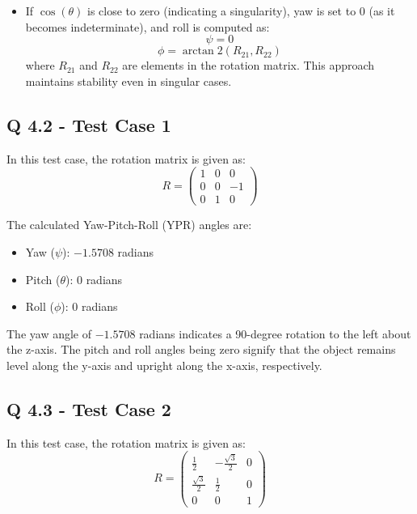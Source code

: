\begin{enumerate}
\begin{itemize}
\begin{itemize}
            \item If \( \cos(\theta) \) is close to zero (indicating a singularity), yaw is set to 0 (as it becomes indeterminate), and roll is computed as:
            \begin{equation}
            \psi = 0
            \end{equation}
            \begin{equation}
            \phi = \arctan2(R_{21}, R_{22})
            \end{equation}
            where \( R_{21} \) and \( R_{22} \) are elements in the rotation matrix. This approach maintains stability even in singular cases.
        \end{itemize}
    \end{itemize}
\end{enumerate}

\subsection{Q 4.2 - Test Case 1 }

In this test case, the rotation matrix is given as:
\[
R =
\begin{pmatrix}
1 & 0 & 0 \\
0 & 0 & -1 \\
0 & 1 & 0
\end{pmatrix}
\]

The calculated Yaw-Pitch-Roll (YPR) angles are:
\begin{itemize}
    \item Yaw (\(\psi\)): \(-1.5708\) radians
    \item Pitch (\(\theta\)): \(0\) radians
    \item Roll (\(\phi\)): \(0\) radians
\end{itemize}

The yaw angle of \(-1.5708\) radians indicates a 90-degree rotation to the left about the z-axis. The pitch and roll angles being zero signify that the object remains level along the y-axis and upright along the x-axis, respectively.

\subsection{Q 4.3 - Test Case 2}

In this test case, the rotation matrix is given as:
\[
R = \begin{pmatrix}
\frac{1}{2} & -\frac{\sqrt{3}}{2} & 0 \\
\frac{\sqrt{3}}{2} & \frac{1}{2} & 0 \\
0 & 0 & 1
\end{pmatrix}
\]

